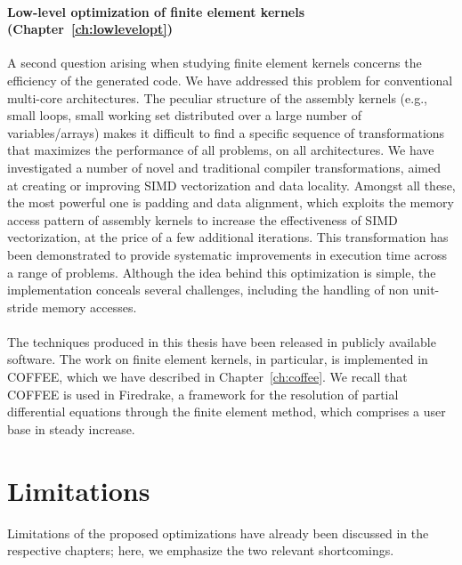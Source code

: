 \paragraph{Low-level optimization of finite element kernels (Chapter~\ref{ch:lowlevelopt})}
A second question arising when studying finite element kernels concerns the efficiency of the generated code. We have addressed this problem for conventional multi-core architectures. The peculiar structure of the assembly kernels (e.g., small loops, small working set distributed over a large number of variables/arrays) makes it difficult to find a specific sequence of transformations that maximizes the performance of all problems, on all architectures. We have investigated a number of novel and traditional compiler transformations, aimed at creating or improving SIMD vectorization and data locality. Amongst all these, the most powerful one is padding and data alignment, which exploits the memory access pattern of assembly kernels to increase the effectiveness of SIMD vectorization, at the price of a few additional iterations. This transformation has been demonstrated to provide systematic improvements in execution time across a range of problems. Although the idea behind this optimization is simple, the implementation conceals several challenges, including the handling of non unit-stride memory accesses.
~\\ 
~\\
The techniques produced in this thesis have been released in publicly available software. The work on finite element kernels, in particular, is implemented in COFFEE, which we have described in Chapter~\ref{ch:coffee}. We recall that COFFEE is used in Firedrake, a framework for the resolution of partial differential equations through the finite element method, which comprises a user base in steady increase.

\section{Limitations}
Limitations of the proposed optimizations have already been discussed in the respective chapters; here, we emphasize the two relevant shortcomings.
 

